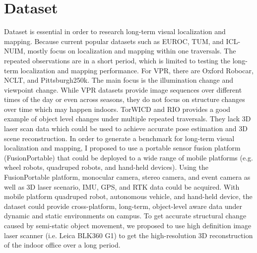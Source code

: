 \section{Dataset}\label{dataset}
Dataset is essential in order to research long-term visual localization and mapping. Because current popular datasets such as EUROC\cite{burri2016euroc}, TUM\cite{sturm12iros}, and ICL-NUIM\cite{handa:etal:ICRA2014}, mostly focus on localization and mapping within one traversals. The repeated observations are in a short period, which is limited to testing the long-term localization and mapping performance. For VPR, there are Oxford Robocar\cite{RobotCarDatasetIJRR}, NCLT\cite{ncarlevaris-2015a}, and Pittsburgh250k\cite{Torii-PAMI2015}. The main focus is the illumination change and viewpoint change. While VPR datasets provide image sequences over different times of the day or even across seasons, they do not focus on structure changes over time which may happen indoors. TorWICD\cite{qian2022pocd} and RIO\cite{wald2019rio} provides a good example of object level changes under multiple repeated traversals. They lack 3D laser scan data which could be used to achieve accurate pose estimation and 3D scene reconstruction. In order to generate a benchmark for long-term visual localization and mapping, I proposed to use a portable sensor fusion platform (FusionPortable) that could be deployed to a wide range of mobile platforms (e.g. wheel robots, quadruped robots, and hand-held devices). Using the FusionPortable platform, monocular camera, stereo camera, and event camera as well as 3D laser scenario, IMU, GPS, and RTK data could be acquired. With mobile platform quadruped robot, autonomous vehicle, and hand-held device, the dataset could provide cross-platform, long-term, object-level aware data under dynamic and static environments on campus. To get accurate structural change caused by semi-static object movement, we proposed to use high definition image laser scanner (i.e. Leica BLK360 G1) to get the high-resolution 3D reconstruction of the indoor office over a long period.


